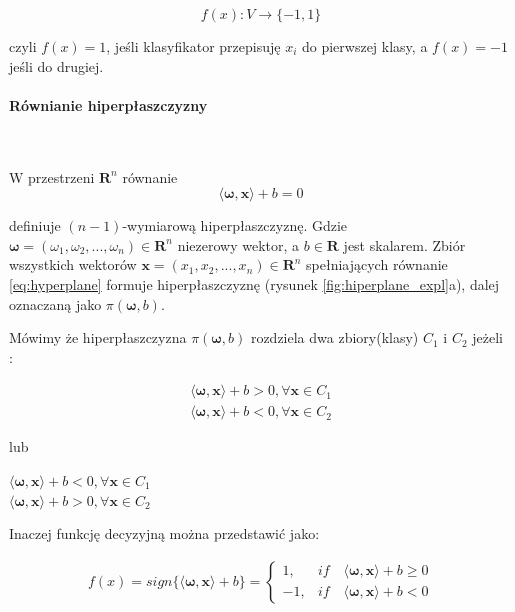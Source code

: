 \documentclass[paper=a4, fontsize=11pt]{scrartcl} %
\newcommand{\myparagraph}[1]{\paragraph{#1}\mbox{}\\}
\numberwithin{equation}{section} %
\numberwithin{figure}{section} %
\begin{document}
    \begin{equation}
        f(x): V \rightarrow \{-1,1\}
    \end{equation}

    czyli $f(x)=1$, jeśli klasyfikator przepisuję $x_i$ do pierwszej klasy, a $f(x)=-1$ jeśli
    do drugiej.

\myparagraph{Równianie hiperpłaszczyzny}
    \par W przestrzeni $\pmb{R}^n$ równanie
    \begin{equation} \label{eq:hyperplane}
        \langle \pmb{\omega}, \pmb{x} \rangle + b = 0
    \end{equation}

    definiuje $(n-1)$-wymiarową hiperpłaszczyznę. Gdzie 
    $\pmb{\omega} = (\omega_1,\omega_2,...,\omega_n) \in \pmb{R}^n$ niezerowy wektor, a $b \in
    \pmb{R}$ jest skalarem. Zbiór wszystkich wektorów $\pmb{x}=(x_1,x_2,...,x_n) \in \pmb{R}^n$
    spełniających równanie \ref{eq:hyperplane} formuje hiperpłaszczyznę (rysunek
    \ref{fig:hiperplane_expl}a), dalej oznaczaną jako $\pi(\pmb{\omega}, b)$.

    \par Mówimy że hiperpłaszczyzna $\pi(\pmb{\omega},b)$ rozdziela dwa zbiory(klasy) $C_1$ i
    $C_2$ jeżeli\\
		\cite{nefedov2016support}:

    \begin{equation} \label{eq:1}
    \begin{split}
        \langle \pmb{\omega}, \pmb{x} \rangle + b > 0, \forall \pmb{x} \in C_1 \\
        \langle \pmb{\omega}, \pmb{x} \rangle + b < 0, \forall \pmb{x} \in C_2 
    \end{split}
    \end{equation}

    lub 

    \begin{center}
        $\langle \pmb{\omega}, \pmb{x} \rangle + b < 0, \forall \pmb{x} \in C_1$ \\
        $\langle \pmb{\omega}, \pmb{x} \rangle + b > 0, \forall \pmb{x} \in C_2$
    \end{center}

    \par Inaczej funkcję decyzyjną można przedstawić jako:

    \begin{align} \label{eq:2}
        f(x) = sign\{\langle \pmb{\omega}, \pmb{x} \rangle + b\} = 
        \begin{cases}
            1,  & if \quad \langle \pmb{\omega}, \pmb{x} \rangle + b \geq 0 \\
            -1, & if \quad \langle \pmb{\omega}, \pmb{x} \rangle + b < 0
        \end{cases}
    \end{align}
\end{document}
